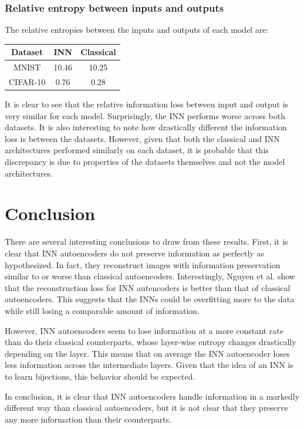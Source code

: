 \documentclass[11pt,letterpaper]{article}
\begin{document}
     \subsubsection{Relative entropy between inputs and outputs}
      The relative entropies between the inputs and outputs of each model are:
      \begin{center}
          \begin{tabular}{||c c c||}
          \hline
          Dataset & INN & Classical \\ [0.5ex]
          \hline\hline
          MNIST & 10.46 & 10.25 \\
          \hline
          CIFAR-10 & 0.76 & 0.28\\
          \hline
      \end{tabular}
      \end{center}
      It is clear to see that the relative information loss between input and output is very similar for each model. Surprisingly, the INN performs worse across both datasets. It is also interesting to note how drastically different the information loss is between the datasets. However, given that both the classical and INN architectures performed similarly on each dataset, it is probable that this discrepancy is due to properties of the datasets themselves and not the model architectures.

\section{Conclusion}
There are several interesting conclusions to draw from these results. First, it is clear that INN autoencoders do not preserve information as perfectly as hypothesized. In fact, they reconstruct images with information preservation similar to or worse than classical autoencoders. Interestingly, Nguyen et al. show that the reconstruction loss for INN autencoders is better than that of classical autoencoders. This suggests that the INNs could be overfitting more to the data while still losing a comparable amount of information.

 However, INN autoencoders seem to lose information at a more constant rate than do their classical counterparts, whose layer-wise entropy changes drastically depending on the layer. This means that on average the INN autoencoder loses less information across the intermediate layers. Given that the idea of an INN is to learn bijections, this behavior should be expected.

 In conclusion, it is clear that INN autoencoders handle information in a markedly different way than classical autoencoders, but it is not clear that they preserve any more information than their counterparts.

{}

\end{document}
